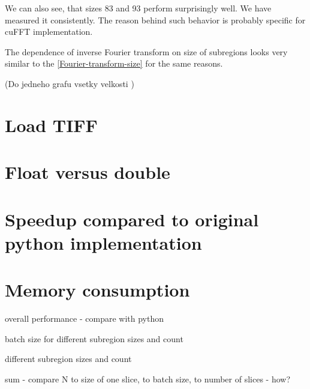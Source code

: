We can also see, that sizes 83 and 93 perform surprisingly well. We have measured it consistently. The reason behind such behavior is probably specific for cuFFT implementation.

The dependence of inverse Fourier transform on size of subregions looks very similar to the \cref{Fourier-transform-size} for the same reasons.

(Do jedneho grafu vsetky velkosti )

\section{Load TIFF}



\section{Float versus double}




\section{Speedup compared to original python implementation}


\section{Memory consumption}


overall performance - compare with python

batch size for different subregion sizes and count

different subregion sizes and count

sum - compare N to size of one slice, to batch size, to number of slices - how?